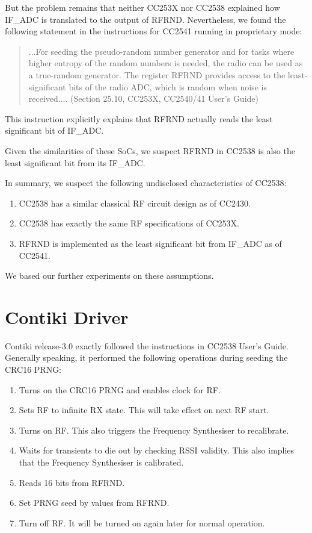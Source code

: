 But the problem remains that neither CC253X nor CC2538 explained how IF\_ADC is translated to the output of RFRND. Nevertheless, we found the following statement in the instructions for CC2541 running in proprietary mode:
\begin{quote}
...For seeding the pseudo-random number generator and for tasks where higher entropy of the random numbers is needed, the radio can be used as a true-random generator. The register RFRND provides access to the least-significant bits of the radio ADC, which is random when noise is received.... (Section 25.10, CC253X, CC2540/41 User's Guide)
\end{quote}

This instruction explicitly explains that RFRND actually reads the least significant bit of IF\_ADC.

Given the similarities of these SoCs, we suspect RFRND in CC2538 is also  the least significant bit from its IF\_ADC.

In summary, we suspect the following undisclosed characteristics of CC2538:
\begin{enumerate}
\item CC2538 has a similar classical RF circuit design as of CC2430.
\item CC2538 has exactly the same RF specifications of CC253X.
\item RFRND is implemented as the least significant bit from IF\_ADC as of CC2541.
\end{enumerate}

We based our further experiments on these assumptions.

\section{Contiki Driver}

Contiki release-3.0 exactly followed the instructions in CC2538 User's Guide. Generally speaking, it performed the following operations during seeding the CRC16 PRNG:
\begin{enumerate}
\item Turns on the CRC16 PRNG and enables clock for RF.
\item Sets RF to infinite RX state. This will take effect on next RF start.
\item Turns on RF. This also triggers the Frequency Synthesiser to recalibrate.
\item Waits for transients to die out by checking RSSI validity. This also implies that the Frequency Synthesiser is calibrated.
\item Reads 16 bits from RFRND.
\item Set PRNG seed by values from RFRND.
\item Turn off RF. It will be turned on again later for normal operation.
\end{enumerate}

